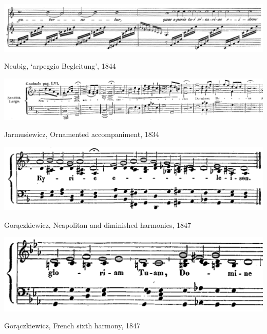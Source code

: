 \begin{landscape}

  \vspace*{\fill}

  \begin{example}
    \centering
    \includegraphics[width=\linewidth]{c/1/ex/neubig_arpeggio_36.png}
    \caption{Neubig, `arpeggio Begleitung', 1844}
    \label{mus:neubig_arpeggio}
  \end{example}

  \vspace*{\fill}

  \begin{example}
    \centering
    \includegraphics[width=\linewidth]{c/1/ex/jar_sanctus_55.png}
    \caption{Jarmusiewicz, Ornamented accompaniment, 1834}
    \label{mus:jar_sanctus_55}
  \end{example}

  \vspace*{\fill}

\end{landscape}

\vspace*{\fill}

\begin{example}
  \centering
  \includegraphics[width=\linewidth]{c/1/ex/wincenty.png}
  \caption{Gor\k{a}czkiewicz, Neapolitan and diminished harmonies, 1847}
  \label{mus:wincenty}
\end{example}

\vspace*{\fill}

\begin{example}
  \centering
  \includegraphics[width=.9\linewidth]{c/1/ex/wincentysixth.png}
  \caption{Gor\k{a}czkiewicz, French sixth harmony, 1847}
  \label{mus:wincentysixth}
\end{example}

